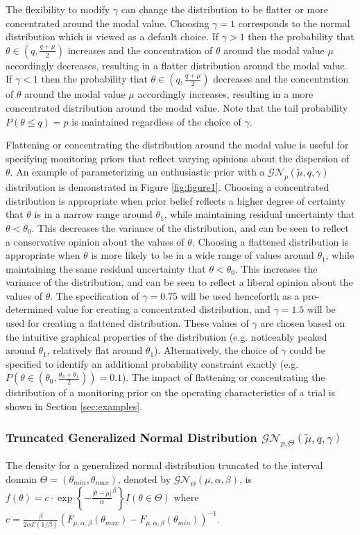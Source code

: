 \documentclass[useAMS,usenatbib,referee]{biom}
\begin{document}
The flexibility to modify $\gamma$ can change the distribution to be flatter or more concentrated around the modal value. Choosing $\gamma=1$ corresponds to the normal distribution which is viewed as a default choice. If $\gamma>1$ then the probability that $\theta\in(q,\frac{q+\mu}{2})$ increases and the concentration of $\theta$ around the modal value $\mu$ accordingly decreases, resulting in a flatter distribution around the modal value. If $\gamma<1$ then the probability that $\theta\in(q,\frac{q+\mu}{2})$ decreases and the concentration of $\theta$ around the modal value $\mu$ accordingly increases, resulting in a more concentrated distribution around the modal value. Note that the tail probability $P(\theta\leq q)=p$ is maintained regardless of the choice of $\gamma$. 

Flattening or concentrating the distribution around the modal value is useful for specifying monitoring priors that reflect varying opinions about the dispersion of $\theta$. An example of parameterizing an enthusiastic prior with a $\mathcal{GN}_p(\tilde{\mu},q,\gamma)$ distribution is demonstrated in Figure \ref{fig:figure1}. Choosing a concentrated distribution is appropriate when prior belief reflects a higher degree of certainty that $\theta$ is in a narrow range around $\theta_1$, while maintaining residual uncertainty that $\theta<\theta_0$. This decreases the variance of the distribution, and can be seen to reflect a conservative opinion about the values of $\theta$. Choosing a flattened distribution is appropriate when $\theta$ is more likely to be in a wide range of values around $\theta_1$, while maintaining the same residual uncertainty that $\theta<\theta_0$. This increases the variance of the distribution, and can be seen to reflect a liberal opinion about the values of $\theta$. The specification of $\gamma=0.75$ will be used henceforth as a pre-determined value for creating a concentrated distribution, and $\gamma=1.5$ will be used for creating a flattened distribution. These values of $\gamma$ are chosen based on the intuitive graphical properties of the distribution (e.g. noticeably peaked around $\theta_1$, relatively flat around $\theta_1$). Alternatively, the choice of $\gamma$ could be specified to identify an additional probability constraint exactly (e.g. $P(\theta\in(\theta_0,\frac{\theta_0+\theta_1}{2}))=0.1$). The impact of flattening or concentrating the distribution of a monitoring prior on the operating characteristics of a trial is shown in Section \ref{sec:examples}.

\subsubsection{Truncated Generalized Normal Distribution $\mathcal{GN}_{p,\Theta}(\tilde{\mu},q,\gamma)$}
The density for a generalized normal distribution truncated to the interval domain $\Theta=(\theta_{min},\theta_{max})$, denoted by $\mathcal{GN}_\Theta(\mu,\alpha,\beta)$, is $f(\theta)=c\cdot\exp\left\{-\frac{|\theta-\mu|}{\alpha}^{\beta}\right\}{I(\theta\in \Theta)}$ where $c=\frac{\beta}{2\alpha \Gamma(1/\beta)}({F_{\mu,\alpha,\beta}(\theta_{max})-F_{\mu,\alpha,\beta}(\theta_{min})})^{-1}$. 
\end{document}
